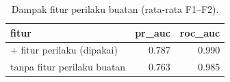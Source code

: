 \begin{table}[ht]
\centering\small
\begin{tabular}{lrr}
\toprule
fitur & pr\_auc & roc\_auc \\
\midrule
+ fitur perilaku (dipakai) & 0.787 & 0.990 \\
tanpa fitur perilaku buatan & 0.763 & 0.985 \\
\bottomrule
\end{tabular}
\caption{Dampak fitur perilaku buatan (rata-rata F1–F2).}
\label{tab:t2_fitur_perilaku}
\end{table}
